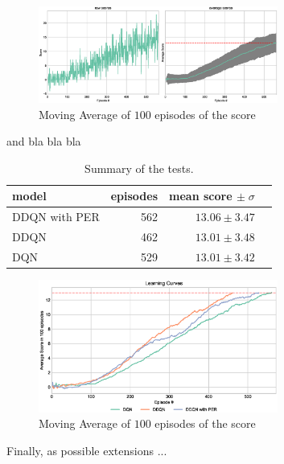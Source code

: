 \documentclass[a4paper]{article}
\begin{document}
\begin{figure}[ht]
\centering
\includegraphics[width=0.7\textwidth]{../notebooks/figures/2018-08-23-ddqnpre-learning-curve.eps}
\caption{Moving Average of $100$ episodes of the score}
\label{fig:ddqnper}
\end{figure}


and bla bla bla

 
\begin{table}[ht!]
\centering
\begin{tabular}{lrrr}
{model} &  episodes &  mean score $\pm \;\sigma$ \\
\midrule
DDQN with PER &       562 &       $13.06\pm3.47$ \\
DDQN          &       462 &       $13.01\pm3.48$ \\
DQN           &       529 &       $13.01\pm3.42$ \\

\end{tabular}
\caption{\label{tab:final_results}Summary of the tests.}
\end{table}

\begin{figure}[ht]
\centering
\includegraphics[width=0.7\textwidth]{../notebooks/figures/2018-08-23-final-comparition-2.eps}
\caption{Moving Average of $100$ episodes of the score}
\label{fig:final_comp}
\end{figure}

Finally, as possible extensions ...








\end{document}
